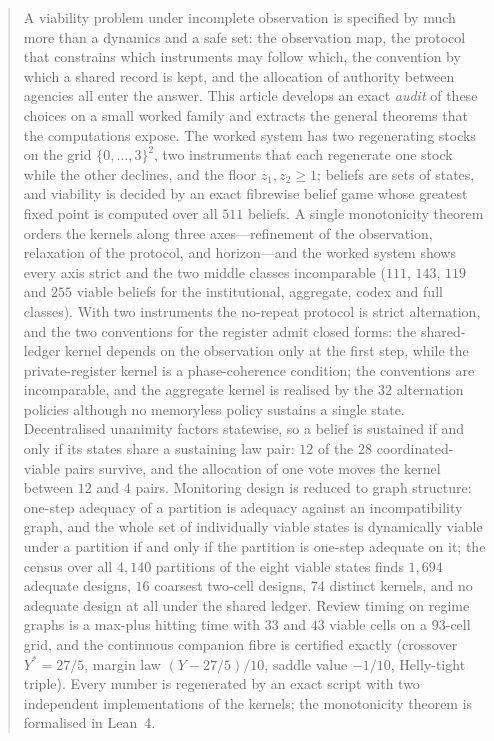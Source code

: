\documentclass[11pt,a4paper]{article}
\theoremstyle{plain}
\theoremstyle{definition}
\theoremstyle{remark}
\begin{document}
\begin{abstract}
A viability problem under incomplete observation is specified by much more than a dynamics and a safe set: the observation map, the protocol that constrains which instruments may follow which, the convention by which a shared record is kept, and the allocation of authority between agencies all enter the answer. This article develops an exact \emph{audit} of these choices on a small worked family and extracts the general theorems that the computations expose. The worked system has two regenerating stocks on the grid $\{0,\dots,3\}^2$, two instruments that each regenerate one stock while the other declines, and the floor $z_1,z_2\ge 1$; beliefs are sets of states, and viability is decided by an exact fibrewise belief game whose greatest fixed point is computed over all $511$ beliefs. A single monotonicity theorem orders the kernels along three axes---refinement of the observation, relaxation of the protocol, and horizon---and the worked system shows every axis strict and the two middle classes incomparable ($111$, $143$, $119$ and $255$ viable beliefs for the institutional, aggregate, codex and full classes). With two instruments the no-repeat protocol is strict alternation, and the two conventions for the register admit closed forms: the shared-ledger kernel depends on the observation only at the first step, while the private-register kernel is a phase-coherence condition; the conventions are incomparable, and the aggregate kernel is realised by the $32$ alternation policies although no memoryless policy sustains a single state. Decentralised unanimity factors statewise, so a belief is sustained if and only if its states share a sustaining law pair: $12$ of the $28$ coordinated-viable pairs survive, and the allocation of one vote moves the kernel between $12$ and $4$ pairs. Monitoring design is reduced to graph structure: one-step adequacy of a partition is adequacy against an incompatibility graph, and the whole set of individually viable states is dynamically viable under a partition if and only if the partition is one-step adequate on it; the census over all $4{,}140$ partitions of the eight viable states finds $1{,}694$ adequate designs, $16$ coarsest two-cell designs, $74$ distinct kernels, and no adequate design at all under the shared ledger. Review timing on regime graphs is a max-plus hitting time with $33$ and $43$ viable cells on a $93$-cell grid, and the continuous companion fibre is certified exactly (crossover $Y^{\ast}=27/5$, margin law $(Y-27/5)/10$, saddle value $-1/10$, Helly-tight triple). Every number is regenerated by an exact script with two independent implementations of the kernels; the monotonicity theorem is formalised in Lean~4.
\end{abstract}
\end{document}

